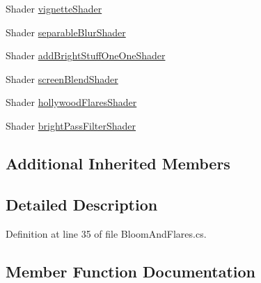 \begin{DoxyCompactItemize}
Shader \mbox{\hyperlink{class_unity_standard_assets_1_1_image_effects_1_1_bloom_and_flares_aa59c84ddf8f0431226591467b38ad85e}{vignette\+Shader}}
\item 
Shader \mbox{\hyperlink{class_unity_standard_assets_1_1_image_effects_1_1_bloom_and_flares_a5e030c0a06d20df37d11dacac8538cd1}{separable\+Blur\+Shader}}
\item 
Shader \mbox{\hyperlink{class_unity_standard_assets_1_1_image_effects_1_1_bloom_and_flares_afbfae8022e95aba9d54cce0bddf998a7}{add\+Bright\+Stuff\+One\+One\+Shader}}
\item 
Shader \mbox{\hyperlink{class_unity_standard_assets_1_1_image_effects_1_1_bloom_and_flares_a45562957df5a2f264e29f06327db7f8d}{screen\+Blend\+Shader}}
\item 
Shader \mbox{\hyperlink{class_unity_standard_assets_1_1_image_effects_1_1_bloom_and_flares_a2519d0a2e96c101627135d63a802264f}{hollywood\+Flares\+Shader}}
\item 
Shader \mbox{\hyperlink{class_unity_standard_assets_1_1_image_effects_1_1_bloom_and_flares_ab597f450e349400d9512bb5ce9acaf59}{bright\+Pass\+Filter\+Shader}}
\end{DoxyCompactItemize}
\subsection*{Additional Inherited Members}


\subsection{Detailed Description}


Definition at line 35 of file Bloom\+And\+Flares.\+cs.



\subsection{Member Function Documentation}
\mbox{\label{class_unity_standard_assets_1_1_image_effects_1_1_bloom_and_flares_a5f5645224068a6a5273f3617bbd73c63}} 

